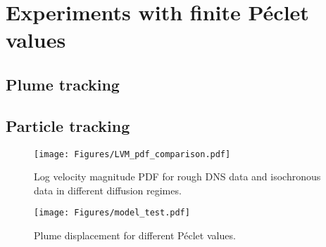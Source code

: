 \chapter{Experiments with finite Péclet values}

\section{Plume tracking}

\section{Particle tracking}


\begin{figure}
	\centering
	\texttt{[image: Figures/LVM\_pdf\_comparison.pdf]}
	\caption{Log velocity magnitude PDF for rough DNS data and isochronous data in different diffusion regimes.}
	\label{fig:lvm_pdf_peinf}
\end{figure}

\begin{figure}
	\centering
	\texttt{[image: Figures/model\_test.pdf]}
	\caption{Plume displacement for different Péclet values.}
	\label{fig:lvm_pdf_peinf}
\end{figure}